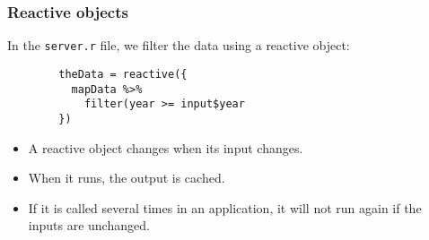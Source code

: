 \documentclass{beamer}
\begin{document}
	\begin{frame}[fragile]
		\frametitle{Reactive objects}

		In the \verb|server.r| file, we filter the data using a reactive object:

		\vspace{1em}
		
		\begin{exampleblock}{}
		\begin{lstlisting}
		theData = reactive({
		  mapData %>%
		    filter(year >= input$year
		})
		\end{lstlisting}
		\end{exampleblock}{}

		\vspace{1em}

		\begin{itemize}
			\item A reactive object changes when its input changes.
			\item When it runs, the output is cached.
			\item If it is called several times in an application, it will not run again if the inputs are unchanged.
		\end{itemize}

	\end{frame}
\end{document}
